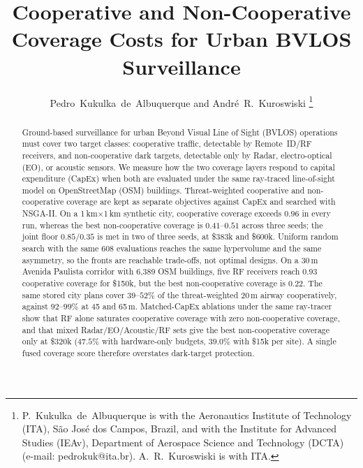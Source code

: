 \documentclass[journal]{IEEEtran}
\begin{document}
\title{Cooperative and Non-Cooperative Coverage Costs for Urban BVLOS Surveillance}

\author{Pedro~Kukulka~de~Albuquerque and Andr\'{e}~R.~Kuroswiski
\thanks{P.~Kukulka~de~Albuquerque is with the Aeronautics Institute of Technology (ITA), S\~{a}o Jos\'{e} dos Campos, Brazil, and with the Institute for Advanced Studies (IEAv), Department of Aerospace Science and Technology (DCTA) (e-mail: pedrokuk@ita.br). A.~R.~Kuroswiski is with ITA.}}


\maketitle

\begin{abstract}
Ground-based surveillance for urban Beyond Visual Line of Sight (BVLOS) operations must cover two target classes: cooperative traffic, detectable by Remote~ID/RF receivers, and non-cooperative dark targets, detectable only by Radar, electro-optical (EO), or acoustic sensors. We measure how the two coverage layers respond to capital expenditure (CapEx) when both are evaluated under the same ray-traced line-of-sight model on OpenStreetMap (OSM) buildings. Threat-weighted cooperative and non-cooperative coverage are kept as separate objectives against CapEx and searched with NSGA-II. On a 1\,km$\times$1\,km synthetic city, cooperative coverage exceeds \(0.96\) in every run, whereas the best non-cooperative coverage is \(0.41\)--\(0.51\) across three seeds; the joint floor \(0.85/0.35\) is met in two of three seeds, at \$383k and \$600k. Uniform random search with the same 608 evaluations reaches the same hypervolume and the same asymmetry, so the fronts are reachable trade-offs, not optimal designs. On a 30\,m Avenida Paulista corridor with 6,389 OSM buildings, five RF receivers reach \(0.93\) cooperative coverage for \$150k, but the best non-cooperative coverage is \(0.22\). The same stored city plans cover \(39\)--\(52\%\) of the threat-weighted 20\,m airway cooperatively, against \(92\)--\(99\%\) at 45 and 65\,m. Matched-CapEx ablations under the same ray-tracer show that RF alone saturates cooperative coverage with zero non-cooperative coverage, and that mixed Radar/EO/Acoustic/RF sets give the best non-cooperative coverage only at \$320k (\(47.5\%\) with hardware-only budgets, \(39.0\%\) with \$15k per site). A single fused coverage score therefore overstates dark-target protection.
\end{abstract}
\end{document}
